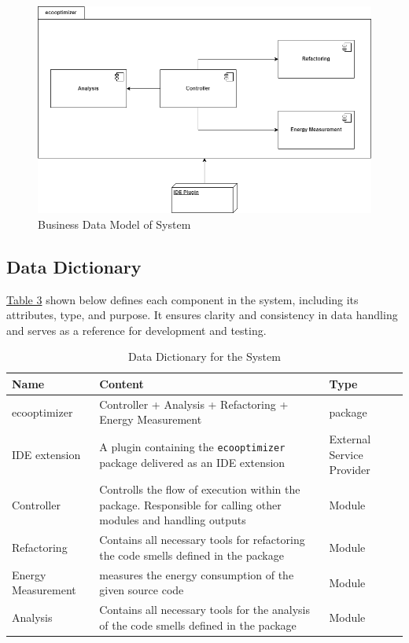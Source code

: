 \documentclass[12pt]{article}
\begin{document}
\begin{figure}[H]
  \centering
  \includegraphics[width=\textwidth]{../Images/business-data-model.png}
  \caption{Business Data Model of System}
  \label{img:bdata-model}
\end{figure}

\newpage
\subsection{Data Dictionary}
\hyperref[tab:data-dict]{Table 3} shown below defines each component
in the system, including its attributes, type, and purpose. It
ensures clarity and consistency in data handling and serves as a
reference for development and testing.

\begin{longtable}[H]{
    >{\raggedright\arraybackslash}p{3.5cm}
    >{\raggedright\arraybackslash}p{9cm}
  >{\raggedright\arraybackslash}p{2cm}}
  \toprule
  \textbf{Name} & \textbf{Content} & \textbf{Type} \\
  \midrule
  \endhead
  \bottomrule
  \caption{Data Dictionary for the System}
  \label{tab:data-dict}
  \endlastfoot

  ecooptimizer & Controller + Analysis + Refactoring + Energy
  Measurement & package \\ \midrule
  IDE extension & A plugin containing the \texttt{ecooptimizer}
  package delivered as an IDE extension & External Service Provider \\ \midrule
  Controller & Controlls the flow of execution within the package.
  Responsible for calling other modules and handling outputs & Module
  \\ \midrule
  Refactoring & Contains all necessary tools for refactoring the code
  smells defined in the package & Module \\ \midrule
  Energy Measurement & measures the energy consumption of the given
  source code & Module \\ \midrule
  Analysis & Contains all necessary tools for the analysis of the
  code smells defined in the package & Module \\
\end{longtable}
\end{document}
